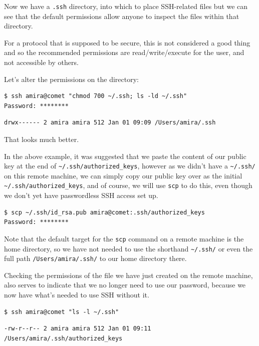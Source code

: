 \documentclass[
]{krantz}
\begin{document}
Now we have a \texttt{.ssh} directory, into which to place SSH-related
files but we can see that the default permissions allow anyone to
inspect the files within that directory.

For a protocol that is supposed to be secure, this is not considered
a good thing and so the recommended permissions are read/write/execute
for the user, and not accessible by others.

Let's alter the permissions on the directory:

\begin{verbatim}
$ ssh amira@comet "chmod 700 ~/.ssh; ls -ld ~/.ssh"
Password: ********
\end{verbatim}

\begin{verbatim}
drwx------ 2 amira amira 512 Jan 01 09:09 /Users/amira/.ssh
\end{verbatim}

That looks much better.

In the above example, it was suggested that we paste the content of
our public key at the end of \texttt{\textasciitilde{}/.ssh/authorized\_keys}, however as
we didn't have a \texttt{\textasciitilde{}/.ssh/} on this remote machine, we can simply
copy our public key over as the initial \texttt{\textasciitilde{}/.ssh/authorized\_keys},
and of course, we will use \texttt{scp} to do this, even though we don't
yet have passwordless SSH access set up.

\begin{verbatim}
$ scp ~/.ssh/id_rsa.pub amira@comet:.ssh/authorized_keys
Password: ********
\end{verbatim}

Note that the default target for the \texttt{scp} command on a remote
machine is the home directory, so we have not needed to use the
shorthand \texttt{\textasciitilde{}/.ssh/} or even the full path \texttt{/Users/amira/.ssh/} to
our home directory there.

Checking the permissions of the file we have just created on
the remote machine, also serves to indicate that we no longer
need to use our password, because we now have what's needed
to use SSH without it.

\begin{verbatim}
$ ssh amira@comet "ls -l ~/.ssh"
\end{verbatim}

\begin{verbatim}
-rw-r--r-- 2 amira amira 512 Jan 01 09:11 /Users/amira/.ssh/authorized_keys
\end{verbatim}
\end{document}

